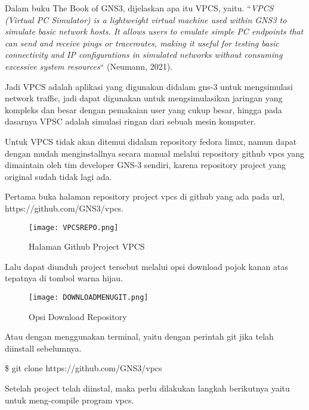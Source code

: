 \documentclass[12pt, a4paper]{article}
\begin{document}
\begin{enumerate}[label=\arabic*.]
          Dalam buku The Book of GNS3, dijelaskan apa itu VPCS, yaitu.
          ``\emph{VPCS (Virtual PC Simulator) is a lightweight virtual machine
          used within GNS3 to simulate basic network hosts. It allows
          users to emulate simple PC endpoints that can send and receive
          pings or traceroutes, making it useful for testing basic connectivity
          and IP configurations in simulated networks without consuming excessive
          system resources}`` (Neumann, 2021).

          Jadi VPCS adalah aplikasi yang digunakan didalam gns-3 untuk mengsimulasi
          network traffic, jadi dapat digunakan untuk mengsimulasikan
          jaringan yang kompleks dan besar dengan pemakaian user yang cukup
          besar, hingga pada dasarnya VPSC adalah simulasi ringan dari sebuah
          mesin komputer.

          Untuk VPCS tidak akan ditemui didalam repository fedora linux, namun
          dapat dengan mudah menginstallnya secara manual melalui repository 
          github vpcs yang dimaintain oleh tim developer GNS-3 sendiri, karena
          repository project yang original sudah tidak lagi ada.

          Pertama buka halaman repository project vpcs di github yang ada
          pada url, https://github.com/GNS3/vpcs.

          \begin{figure}[h]
              \centering
              \texttt{[image: VPCSREPO.png]}
              \caption{\small{Halaman Github Project VPCS}}
          \end{figure}

          Lalu dapat diunduh project tersebut melalui opsi download pojok
          kanan atas tepatnya di tombol warna hijau.

          \begin{figure}[h]
              \centering
              \texttt{[image: DOWNLOADMENUGIT.png]}
              \caption{\small{Opsi Download Repository}}
          \end{figure}

          Atau dengan menggunakan terminal, yaitu dengan perintah git jika telah
          diinstall sebelumnya.

          \$ git clone https://github.com/GNS3/vpcs

          Setelah project telah diinstal, maka perlu dilakukan langkah berikutnya
          yaitu untuk meng-compile program vpcs.


\end{enumerate}
\end{document}
